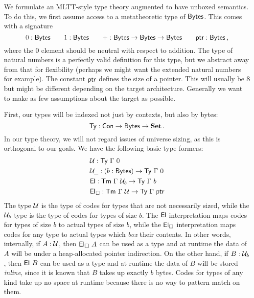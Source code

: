 \[
\newcommand{\syn}{\textsf}
\newcommand{\Ty}{\syn{Ty}}
\newcommand{\Tm}{\syn{Tm}}
\newcommand{\Con}{\syn{Con}}
\newcommand{\Tms}{\syn{Tms}}
\newcommand{\Tel}{\syn{Tel}}
\newcommand{\Sub}{\syn{Sub}}
\newcommand{\El}{\syn{El}}
\newcommand{\n}{\syn{n}}
\newcommand{\code}{\syn{code}}
\newcommand{\ap}{\syn{ap}}
\newcommand{\univ}{\mathcal{U}}
\newcommand{\ptr}{\syn{ptr}}
\newcommand{\Bytes}{\syn{Bytes}}
\newcommand{\meta}{\textbf}
\newcommand{\remb}{\urcorner}
\newcommand{\Set}{\meta{Set}}
\]

We formulate an MLTT-style type theory augmented to have unboxed
semantics. To do this, we first assume access to a metatheoretic type of
\(\Bytes\). This comes with a signature \[
0 : \Bytes \qquad 1 : \Bytes \qquad + : \Bytes \to \Bytes \to \Bytes \qquad \ptr : \Bytes \,,
\] where the \(0\) element should be neutral with respect to addition.
The type of natural numbers is a perfectly valid definition for this
type, but we abstract away from that for flexibility (perhaps we might
want the extended natural numbers for example). The constant \(\ptr\)
defines the size of a pointer. This will usually be 8 but might be
different depending on the target architecture. Generally we want to
make as few assumptions about the target as possible.

First, our types will be indexed not just by contexts, but also by
bytes: \[
\Ty : \Con \to \Bytes \to \Set \,.
\] In our type theory, we will not regard issues of universe sizing, as
this is orthogonal to our goals. We have the following basic type
formers: \[
\begin{aligned}
&\univ : \Ty\ \Gamma\ 0 \\
&\univ_{\_} : (b : \Bytes) \to \Ty\ \Gamma\ 0 \\
&\El : \Tm\ \Gamma\ \univ_b \to \Ty\ \Gamma\ b \\
&\El_\square : \Tm\ \Gamma\ \univ \to \Ty\ \Gamma\ \ptr \\
\end{aligned}
\] The type \(\univ\) is the type of codes for types that are not
necessarily sized, while the \(\univ_b\) type is the type of codes for
types of size \(b\). The \(\El\) interpretation maps codes for types of
size \(b\) to actual types of size \(b\), while the \(\El_\square\)
interpretation maps codes for any type to actual types which \emph{box}
their contents. In other words, internally, if \(A : \univ\), then
\(\El_\square\ A\) can be used as a type and at runtime the data of
\(A\) will be under a heap-allocated pointer indirection. On the other
hand, if \(B : \univ_b\), then \(\El\ B\) can be used as a type and at
runtime the data of \(B\) will be stored \emph{inline}, since it is
known that \(B\) takes up exactly \(b\) bytes. Codes for types of any
kind take up no space at runtime because there is no way to pattern
match on them.

